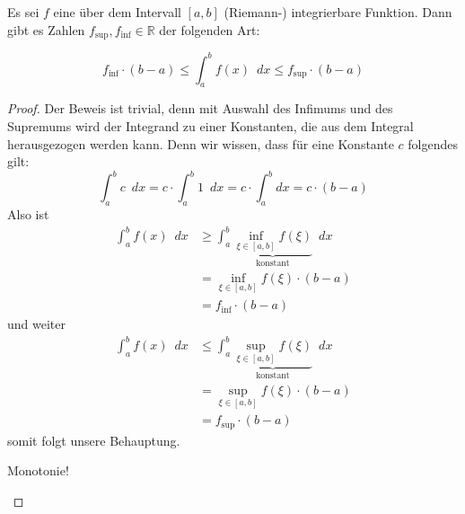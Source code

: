 \begin{satz}\label{satz:mittel}
Es sei $f$ eine über dem Intervall $[a,b]$ (Riemann-) integrierbare Funktion. Dann gibt es Zahlen $f_{\sup}, f_{\inf} \in \mathbb{R}$ der folgenden Art:

\begin{equation}
f_{\inf}\cdot (b-a) \le \int_{a}^{b} f(x) \enspace dx \le f_{\sup} \cdot (b-a)
\end{equation}
\end{satz}
\begin{proof}
Der Beweis ist trivial, denn mit Auswahl des Infimums und des Supremums wird der Integrand zu einer Konstanten, die aus dem Integral herausgezogen werden kann. Denn wir wissen, dass für eine Konstante $c$ folgendes gilt:
\begin{equation}
\int_a^b c \enspace dx = c\cdot \int_a^b 1 \enspace dx = c\cdot \int_a^b dx = c\cdot(b-a)
\end{equation}
Also ist
\begin{equation}
\begin{split}
\int_a^b f(x)\enspace dx &\ge \int_a^b \underbrace{\inf_{\xi \in [a,b] } f(\xi)}_{\text{konstant}} \enspace dx \\
 &= \inf_{\xi \in [a,b] } f(\xi) \cdot (b-a) \\
 &= f_{\inf}\cdot (b-a)
\end{split}
\end{equation}
und weiter
\begin{equation}
\begin{split}
\int_a^b f(x)\enspace dx &\le \int_a^b \underbrace{\sup_{\xi \in [a,b] } f(\xi)}_{\text{konstant}} \enspace dx \\
 &= \sup_{\xi \in [a,b] } f(\xi) \cdot (b-a) \\
 &= f_{\sup}\cdot (b-a)
\end{split}
\end{equation}
somit folgt unsere Behauptung. 
\begin{TODO}
Monotonie!
\end{TODO}

\end{proof}


